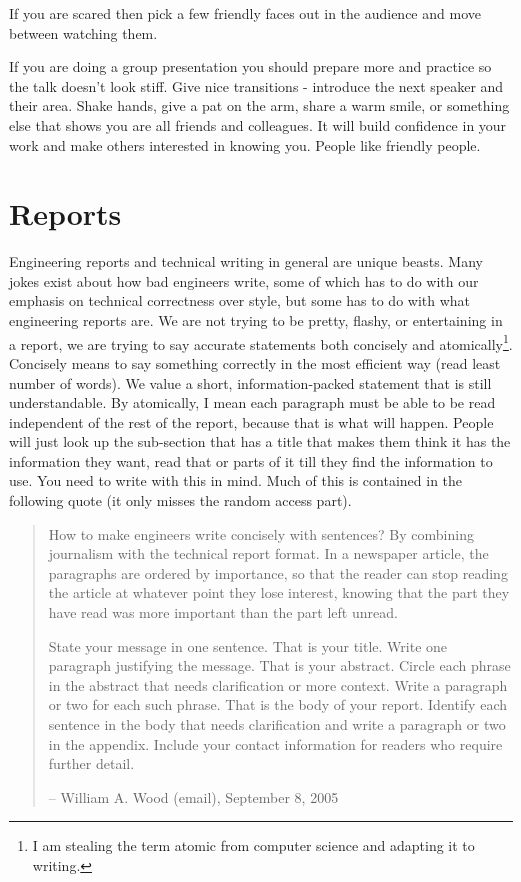 If you are scared then pick a few friendly faces out in the audience and move between watching them.

If you are doing a group presentation you should prepare more and practice so the talk doesn't look stiff.  Give nice transitions - introduce the next speaker and their area.  Shake hands, give a pat on the arm, share a warm smile, or something else that shows you are all friends and colleagues.  It will build confidence in your work and make others interested in knowing you.  People like friendly people. 

\section{Reports}

Engineering reports and technical writing in general are unique beasts.  Many jokes exist about how bad engineers write, some of which has to do with our emphasis on technical correctness over style, but some has to do with what engineering reports are.  We are not trying to be pretty, flashy, or entertaining in a report, we are trying to say accurate statements both concisely and atomically\footnote{I am stealing the term atomic from computer science and adapting it to writing.}.  Concisely means to say something correctly in the most efficient way (read least number of words).  We value a short, information-packed statement that is still understandable.  By atomically, I mean each paragraph must be able to be read independent of the rest of the report, because that is what will happen. People will just look up the sub-section that has a title that makes them think it has the information they want, read that or parts of it till they find the information to use.  You need to write with this in mind.  Much of this is contained in the following quote (it only misses the random access part).

\begin{quote}
How to make engineers write concisely with sentences? By combining journalism with the technical report format. In a newspaper article, the paragraphs are ordered by importance, so that the reader can stop reading the article at whatever point they lose interest, knowing that the part they have read was more important than the part left unread.

State your message in one sentence. That is your title. Write one paragraph justifying the message. That is your abstract. Circle each phrase in the abstract that needs clarification or more context. Write a paragraph or two for each such phrase. That is the body of your report. Identify each sentence in the body that needs clarification and write a paragraph or two in the appendix. Include your contact information for readers who require further detail.

\begin{flushright}-- William A. Wood (email), September 8, 2005\end{flushright}
\end{quote}
